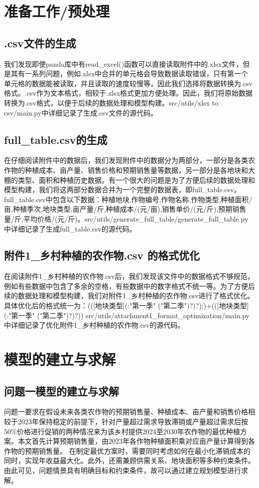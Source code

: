 \documentclass{cumcmthesis}
\begin{document}
\section{准备工作/预处理}
\subsection{.csv文件的生成}
我们发现即使panda库中有read\_excel()函数可以直接读取附件中的.xlsx文件，但是其有一系列问题，例如.xlsx中合并的单元格会导致数据读取错误，只有第一个单元格的数据能被读取，并且读取的速度较慢等，因此我们选择将数据转换为.csv格式。.csv作为文本格式，相较于.xlsx格式更加方便处理。因此，我们将原始数据转换为.csv格式，以便于后续的数据处理和模型构建。src/utils/xlsx to csv/main.py中详细记录了生成.csv文件的源代码。

\subsection{full\_table.csv的生成}
在仔细阅读附件中的数据后，我们发现附件中的数据分为两部分，一部分是各类农作物的种植成本、亩产量、销售价格和预期销售量等数据，另一部分是各地块和大棚的类型、面积和种植历史数据。有一个很大的问题是为了方便后续的数据处理和模型构建，我们将这两部分数据合并为一个完整的数据表，即full\_table.csv。full\_table.csv中包含以下数据：种植地块,作物编号,作物名称,作物类型,种植面积/亩,种植季次,地块类型,亩产量/斤,种植成本/(元/亩),销售单价/(元/斤),预期销售量/斤,平均价格/(元/斤)。src/utils/generate\_full\_table/generate\_full\_table.py中详细记录了生成full\_table.csv的源代码。

\subsection{附件1\_乡村种植的农作物.csv 的格式优化}
在阅读附件1\_乡村种植的农作物.csv后，我们发现该文件中的数据格式不够规范，例如有些数据中包含了多余的空格，有些数据中的数字格式不统一等。为了方便后续的数据处理和模型构建，我们对附件1\_乡村种植的农作物.csv进行了格式优化。具体优化后的格式统一为：(([地块类型](:"第一季" ("第二季")?)?);)+(([地块类型](:"第一季" ("第二季")?)?))
src/utils/attachment1\_format\_optimization/main.py中详细记录了优化附件1\_乡村种植的农作物.csv的源代码。


\section{模型的建立与求解}
\subsection{问题一模型的建立与求解}
问题一要求在假设未来各类农作物的预期销售量、种植成本、亩产量和销售价格相较于2023年保持稳定的前提下，针对产量超过需求导致滞销或产量超过需求后按50\%价格进行促销的两种情况来为该乡村提供2024至2030年农作物的最优种植方案。本文首先计算预期销售量，由2023年各作物种植面积乘对应亩产量计算得到各作物的预期销售量。
在制定最优方案时，需要同时考虑如何在最小化滞销成本的同时，实现年收益最大化。此外，还需兼顾供需关系、地块面积等多种约束条件。由此可见，问题情景具有明确目标和约束条件，故可以通过建立规划模型进行求解。
\end{document}
